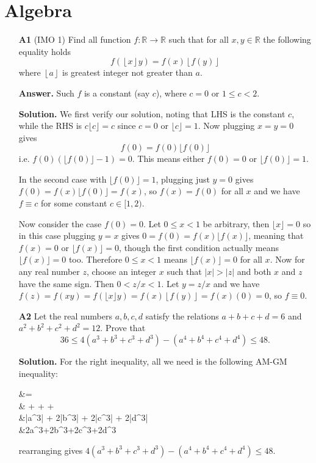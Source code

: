\documentclass[11pt]{article}
\newcommand{\<}{\langle}
\renewcommand{\>}{\rangle}
\begin{document}
\section*{Algebra}
\begin{enumerate}
	\item [\textbf{A1}] (IMO 1) Find all function $f:\mathbb{R}\rightarrow\mathbb{R}$ such that for all $x,y\in\mathbb{R}$ the following equality holds \[
	f(\left\lfloor x\right\rfloor y)=f(x)\left\lfloor f(y)\right\rfloor \] where $\left\lfloor a\right\rfloor $ is greatest integer not greater than $a.$
	
	\textbf{Answer.} Such $f$ is a constant (say $c$), where $c=0$ or $1\le c < 2$. 
	
	\textbf{Solution.} 
	We first verify our solution, noting that LHS is the constant $c$, 
	while the RHS is $c\lfloor c\rfloor=c$ since $c=0$ or $\lfloor c\rfloor=1$. 
	Now plugging $x=y=0$ gives 
	\begin{equation}
		f(0)=f(0)\lfloor f(0)\rfloor
	\end{equation}
	i.e. $f(0)(\lfloor f(0)\rfloor-1)=0$. 
	This means either $f(0)=0$ or $\lfloor f(0)\rfloor=1$. 
	
	In the second case with $\lfloor f(0)\rfloor=1$, plugging just $y=0$ gives $f(0)=f(x)\lfloor f(0)\rfloor=f(x)$, so $f(x)=f(0)$ for all $x$ and we have $f\equiv c$ for some constant $c\in [1, 2)$. 
	
	Now consider the case $f(0) = 0$. 
	Let $0\le x<1$ be arbitrary, then $\lfloor x\rfloor =0$ so in this case plugging $y=x$ gives $0=f(0)=f(x)\lfloor f(x)\rfloor $, meaning that 
	$f(x)=0$ or $\lfloor f(x)\rfloor =0$, though the first condition actually means $\lfloor f(x)\rfloor =0$ too. 
	Therefore $0\le x<1$ means $\lfloor f(x)\rfloor =0$ for all $x$. 
	Now for any real number $z$, choose an integer $x$ such that $|x|>|z|$ and both $x$ and $z$ have the same sign. Then $0<z/x<1$. Let $y=z/x$ and we have 
	$f(z)=f(xy)=f(\lfloor x\rfloor y)=f(x)\left\lfloor f(y)\right\rfloor =f(x)(0)=0$, so $f\equiv 0$. 
	
	
	\item[\textbf{A2}] Let the real numbers $a,b,c,d$ satisfy the relations $a+b+c+d=6$ and $a^2+b^2+c^2+d^2=12.$ Prove that
	\[36 \leq 4 \left(a^3+b^3+c^3+d^3\right) - \left(a^4+b^4+c^4+d^4 \right) \leq 48.\]
	
	\textbf{Solution.} For the right inequality, all we need is the following AM-GM inequality: 
	\begin{flalign}
	&=
	\nonumber\\
	&\ge {} +  + +
	\nonumber\\
	&|a^3| + 2|b^3| + 2|c^3| + 2|d^3|
	\nonumber\\
	&\ge 2a^3+2b^3+2c^3+2d^3
	\end{flalign}
	rearranging gives $4 \left(a^3+b^3+c^3+d^3\right) - \left(a^4+b^4+c^4+d^4 \right) \leq 48$. 
	

\end{enumerate}
\end{document}
